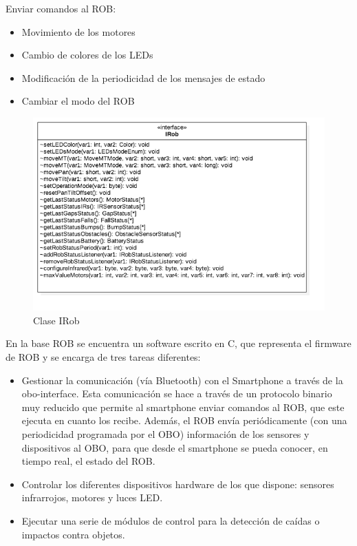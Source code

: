 Enviar comandos al ROB:
\begin{itemize}
	\item Movimiento de los motores
	\item Cambio de colores de los LEDs
	\item Modificación de la periodicidad de los mensajes de estado
	\item Cambiar el modo del ROB
\end{itemize}

\begin{figure}
	\centering
	\includegraphics[width=0.9\linewidth]{imagenes/diagramas/IRob.png}
	\caption{Clase IRob}
	\label{fig:irob}
\end{figure}


En la base ROB se encuentra un software escrito en C, que representa el firmware de ROB y se encarga de tres tareas diferentes:
\begin{itemize}
	\item Gestionar la comunicación (vía Bluetooth) con el Smartphone a través de la obo-interface. Esta comunicación se hace a través de un protocolo binario muy reducido que permite al smartphone enviar comandos al ROB, que este ejecuta en cuanto los recibe. Además, el ROB envía periódicamente (con una periodicidad programada por el OBO) información de los sensores y dispositivos al OBO, para que desde el smartphone se pueda conocer, en tiempo real, el estado del ROB. 
	\item Controlar los diferentes dispositivos hardware de los que dispone: sensores infrarrojos, motores y luces LED. 
	\item Ejecutar una serie de módulos de control para la detección de caídas o impactos contra objetos.

\end{itemize}


